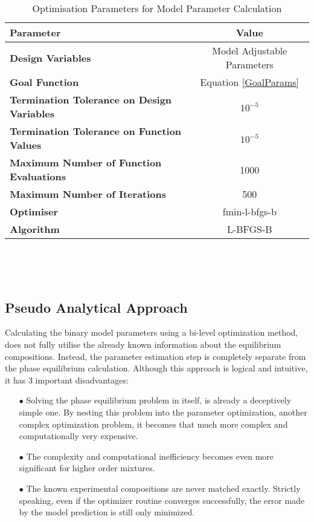 \begin{table}
\begin{tabularx}{\textwidth}{l|c}
\hline
\textbf{Parameter}&\textbf{Value}\\
\hline
\hline
\textbf{Design Variables}& Model Adjustable Parameters\\
\textbf{Goal Function}&Equation \ref{GoalParams}\\
\textbf{Termination Tolerance on Design Variables}&$10^{-5}$\\
\textbf{Termination Tolerance on Function Values}&$10^{-5}$\\
\textbf{Maximum Number of Function Evaluations}&1000\\
\textbf{Maximum Number of Iterations}&500\\				
\textbf{Optimiser }&fmin-l-bfgs-b\\
\textbf{Algorithm}& L-BFGS-B \\
\hline
\end{tabularx}\\
\caption{Optimisation Parameters for Model Parameter Calculation} \label{ParamOptParam}			
\end{table}\

				
\subsection{Pseudo Analytical Approach}\label{BinaryPAMethodSection}

Calculating the binary model parameters using a bi-level optimization method, does not fully utilise the already known information about the equilibrium compositions. Instead, the parameter estimation step is completely separate from the phase equilibrium calculation. Although this approach is logical and intuitive, it has 3 important disadvantages:\

\begin{itemize}
\item[$\bullet$] Solving the phase equilibrium problem in itself, is already a deceptively simple one. By nesting this problem into the parameter optimization, another complex optimization problem, it becomes that much more complex and computationally very expensive. \
\item[$\bullet$] The complexity and computational inefficiency becomes even more significant for higher order mixtures.\
\item[$\bullet$] The known experimental compositions are never matched exactly. Strictly speaking, even if the optimizer routine converges successfully, the error made by the model prediction is still only minimized.\
\end{itemize}\

